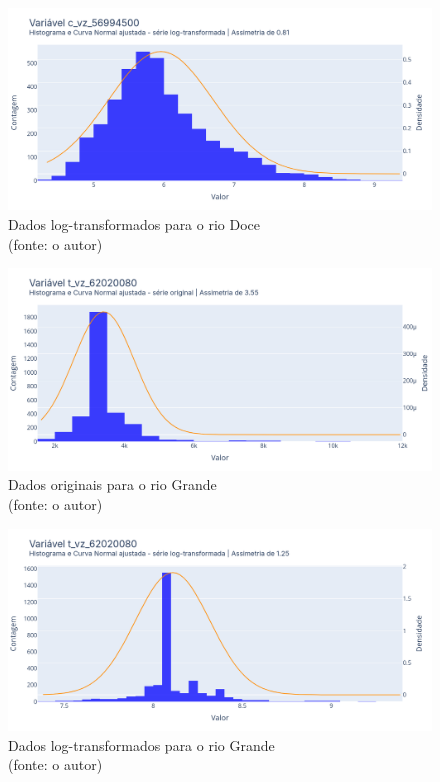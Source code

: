 \begin{figure}[!h]
	\centering
	\includegraphics[scale=0.33]{Figuras/rio_doce/rio_doce_depois_log.png}
	\caption{Dados log-transformados para o rio Doce\\(fonte: o autor)}
	\label{fig:rio_doce_depois_log}
\end{figure}

\begin{figure}[!h]
	\centering
	\includegraphics[scale=0.33]{Figuras/rio_grande/rio_grande_antes_log.png}
	\caption{Dados originais para o rio Grande\\(fonte: o autor)}
	\label{fig:rio_grande_antes_log}
\end{figure}

\begin{figure}[!h]
	\centering
	\includegraphics[scale=0.33]{Figuras/rio_grande/rio_grande_depois_log.png}
	\caption{Dados log-transformados para o rio Grande\\(fonte: o autor)}
	\label{fig:rio_grande_depois_log}
\end{figure}

